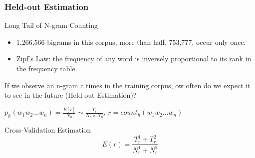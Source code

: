 \documentclass{beamer}
\begin{document}



\begin{frame}\frametitle{Held-out Estimation}

\begin{block}{Long Tail of N-gram Counting}
\begin{itemize}
\item 1,266,566 bigrams in this corpus, more than
half, 753,777, occur only once.
\item Zipf's Law:  the frequency of any word is inversely proportional to its rank in the frequency table. 
\end{itemize}

If we observe an n-gram
c times in the training corpus, ow often
do we expect it to see in the future (Held-out Estimation)?

$p_h(w_1w_2\ldots w_n) = \frac{E[r]}{N_h} \sim \frac{T_r}{N_r\times
  N_h}$,
$r = count_h(w_1w_2\ldots w_n)$
\end{block}

\begin{block}{Cross-Validation Estimation}
$$E(r) = \frac{T_r^1+T_r^2}{N_r^1+N_r^2}$$
\end{block}


\end{frame}
\end{document}
